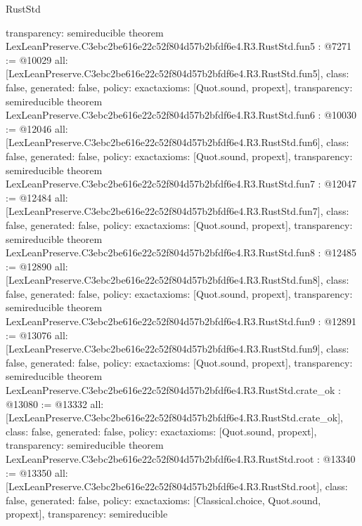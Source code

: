 \begin{lexlean}{RustStd}
\begin{coremodule}
{  transparency: semireducible
}
theorem LexLeanPreserve.C3ebc2be616e22c52f804d57b2bfdf6e4.R3.RustStd.fun5 : @7271 := @10029 {
  all: [LexLeanPreserve.C3ebc2be616e22c52f804d57b2bfdf6e4.R3.RustStd.fun5],
  class: false,
  generated: false,
  policy: exact{axioms: [Quot.sound, propext]},
  transparency: semireducible
}
theorem LexLeanPreserve.C3ebc2be616e22c52f804d57b2bfdf6e4.R3.RustStd.fun6 : @10030 := @12046 {
  all: [LexLeanPreserve.C3ebc2be616e22c52f804d57b2bfdf6e4.R3.RustStd.fun6],
  class: false,
  generated: false,
  policy: exact{axioms: [Quot.sound, propext]},
  transparency: semireducible
}
theorem LexLeanPreserve.C3ebc2be616e22c52f804d57b2bfdf6e4.R3.RustStd.fun7 : @12047 := @12484 {
  all: [LexLeanPreserve.C3ebc2be616e22c52f804d57b2bfdf6e4.R3.RustStd.fun7],
  class: false,
  generated: false,
  policy: exact{axioms: [Quot.sound, propext]},
  transparency: semireducible
}
theorem LexLeanPreserve.C3ebc2be616e22c52f804d57b2bfdf6e4.R3.RustStd.fun8 : @12485 := @12890 {
  all: [LexLeanPreserve.C3ebc2be616e22c52f804d57b2bfdf6e4.R3.RustStd.fun8],
  class: false,
  generated: false,
  policy: exact{axioms: [Quot.sound, propext]},
  transparency: semireducible
}
theorem LexLeanPreserve.C3ebc2be616e22c52f804d57b2bfdf6e4.R3.RustStd.fun9 : @12891 := @13076 {
  all: [LexLeanPreserve.C3ebc2be616e22c52f804d57b2bfdf6e4.R3.RustStd.fun9],
  class: false,
  generated: false,
  policy: exact{axioms: [Quot.sound, propext]},
  transparency: semireducible
}
theorem LexLeanPreserve.C3ebc2be616e22c52f804d57b2bfdf6e4.R3.RustStd.crate_ok : @13080 := @13332 {
  all: [LexLeanPreserve.C3ebc2be616e22c52f804d57b2bfdf6e4.R3.RustStd.crate_ok],
  class: false,
  generated: false,
  policy: exact{axioms: [Quot.sound, propext]},
  transparency: semireducible
}
theorem LexLeanPreserve.C3ebc2be616e22c52f804d57b2bfdf6e4.R3.RustStd.root : @13340 := @13350 {
  all: [LexLeanPreserve.C3ebc2be616e22c52f804d57b2bfdf6e4.R3.RustStd.root],
  class: false,
  generated: false,
  policy: exact{axioms: [Classical.choice, Quot.sound, propext]},
  transparency: semireducible
}


\end{coremodule}
\end{lexlean}
